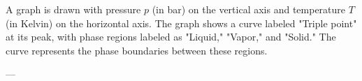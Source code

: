 A graph is drawn with pressure \( p \) (in bar) on the vertical axis and temperature \( T \) (in Kelvin) on the horizontal axis. The graph shows a curve labeled "Triple point" at its peak, with phase regions labeled as "Liquid," "Vapor," and "Solid." The curve represents the phase boundaries between these regions.

---